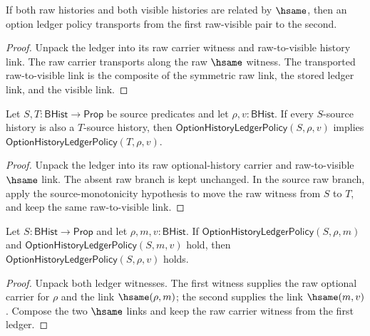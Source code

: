 \begin{theorem}
\label{thm:option-ledger-hsame-transport}
If both raw histories and both visible histories are related by $\hsame$, then
an option ledger policy transports from the first raw-visible pair to the
second.
\end{theorem}
\begin{proof}
Unpack the ledger into its raw carrier witness and raw-to-visible history link.
The raw carrier transports along the raw $\hsame$ witness. The transported
raw-to-visible link is the composite of the symmetric raw link, the stored
ledger link, and the visible link.
\end{proof}

\begin{theorem}
\label{thm:option-history-ledger-policy-source-monotonicity}
Let $S,T:\mathsf{BHist}\to\mathsf{Prop}$ be source predicates and let
$\rho,v:\mathsf{BHist}$. If every $S$-source history is also a $T$-source
history, then $\mathsf{OptionHistoryLedgerPolicy}(S,\rho,v)$ implies
$\mathsf{OptionHistoryLedgerPolicy}(T,\rho,v)$.
\end{theorem}
\begin{proof}
Unpack the ledger into its raw optional-history carrier and raw-to-visible
$\hsame$ link. The absent raw branch is kept unchanged. In the source raw
branch, apply the source-monotonicity hypothesis to move the raw witness from
$S$ to $T$, and keep the same raw-to-visible link.
\end{proof}

\begin{theorem}
\label{thm:option-ledger-policy-trans}
Let $S:\mathsf{BHist}\to\mathsf{Prop}$ and let
$\rho,m,v:\mathsf{BHist}$. If
$\mathsf{OptionHistoryLedgerPolicy}(S,\rho,m)$ and
$\mathsf{OptionHistoryLedgerPolicy}(S,m,v)$ hold, then
$\mathsf{OptionHistoryLedgerPolicy}(S,\rho,v)$ holds.
\end{theorem}
\begin{proof}
Unpack both ledger witnesses. The first witness supplies the raw optional
carrier for $\rho$ and the link $\hsame(\rho,m)$; the second supplies the link
$\hsame(m,v)$. Compose the two $\hsame$ links and keep the raw carrier witness
from the first ledger.
\end{proof}

